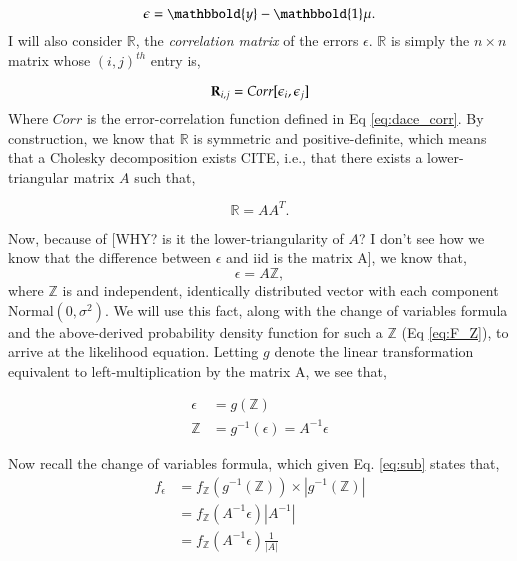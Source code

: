 \begin{equation}\label{eq:epsilon}
\epsilon = \mathbbold{y} - \mathbbold{1}\mu.
\end{equation}
I will also consider $\mathbb{R}$, the \emph{correlation matrix} of the errors $\epsilon$. $\mathbb{R}$ is simply the $n\times n$ matrix whose $(i,j)^{th}$ entry is, 

\begin{equation}\label{eq:R}
\mathbf{R}_{i,j}=Corr[\epsilon_i,\epsilon_j]
\end{equation}
Where $Corr$ is the error-correlation function defined in Eq \ref{eq:dace_corr}. By construction, we know that $\mathbb{R}$ is symmetric and positive-definite, which means that a Cholesky decomposition exists CITE\cite{linear_algebra}, i.e., that there exists a lower-triangular matrix $A$ such that,

\begin{equation} \label{eq:cholesky}
\mathbb{R} = A A^T.
\end{equation}

Now, because of [WHY? is it the lower-triangularity of $A$? I don't see how we know that the difference between $\epsilon$ and iid is the matrix A], we know that,
\begin{equation} \label{Y_sub}
\epsilon=A\mathbb{Z},
\end{equation}
where $\mathbb{Z}$ is and independent, identically distributed vector with each component Normal$(0,\sigma^2)$. We will use this fact, along with the change of variables formula and the above-derived probability density function for such a $\mathbb{Z}$ (Eq \ref{eq:F_Z}), to arrive at the likelihood equation. Letting $g$ denote the linear transformation equivalent to left-multiplication by the matrix A, we see that,

\begin{align}
\epsilon &= g(\mathbb{Z}) \nonumber \\
\mathbb{Z} &= g^{-1}(\epsilon) = A^{-1}\epsilon
\label{eq:sub}
\end{align}



Now recall the change of variables formula, which given Eq. \ref{eq:sub} states that,
\begin{align} \label{eq:change_of_vars}
f_\epsilon &= f_\mathbb{Z}\left (g^{-1}(\mathbb{Z})\right)\times \left | g^{-1}(\mathbb{Z}) \right | \\
			 &= f_\mathbb{Z}\left (A^{-1}\epsilon\right) |A^{-1}| \\ 
			 &= f_\mathbb{Z}\left (A^{-1}\epsilon\right) \frac{1}{|A|}
\end{align}

